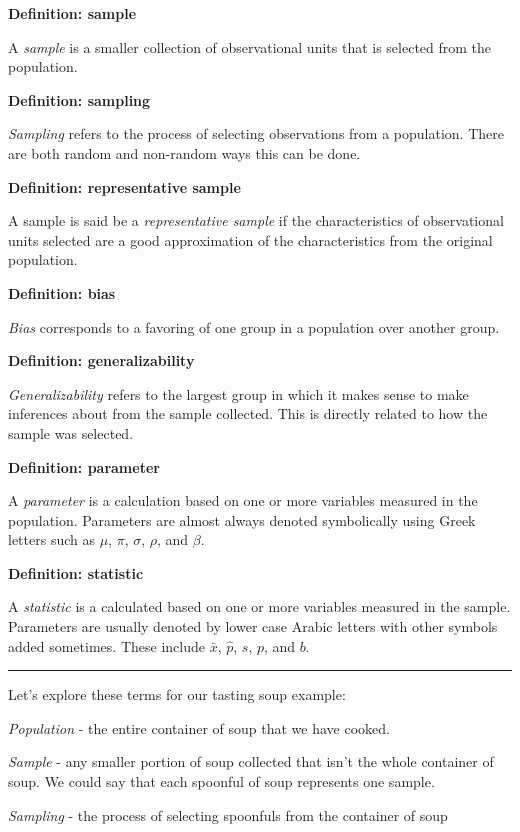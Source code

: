 \documentclass[]{tufte-book}
\let\oldrule=\rule
\renewcommand{\rule}[1]{\oldrule{\linewidth}}
\begin{document}
\textbf{Definition: sample}

A \emph{sample} is a smaller collection of observational units that is
selected from the population.

\textbf{Definition: sampling}

\emph{Sampling} refers to the process of selecting observations from a
population. There are both random and non-random ways this can be done.

\textbf{Definition: representative sample}

A sample is said be a \emph{representative sample} if the
characteristics of observational units selected are a good approximation
of the characteristics from the original population.

\textbf{Definition: bias}

\emph{Bias} corresponds to a favoring of one group in a population over
another group.

\textbf{Definition: generalizability}

\emph{Generalizability} refers to the largest group in which it makes
sense to make inferences about from the sample collected. This is
directly related to how the sample was selected.

\textbf{Definition: parameter}

A \emph{parameter} is a calculation based on one or more variables
measured in the population. Parameters are almost always denoted
symbolically using Greek letters such as \(\mu\), \(\pi\), \(\sigma\),
\(\rho\), and \(\beta\).

\textbf{Definition: statistic}

A \emph{statistic} is a calculated based on one or more variables
measured in the sample. Parameters are usually denoted by lower case
Arabic letters with other symbols added sometimes. These include
\(\bar{x}\), \(\hat{p}\), \(s\), \(p\), and \(b\).

\begin{center}\rule{0.5\linewidth}{\linethickness}\end{center}

Let's explore these terms for our tasting soup example:

\emph{Population} - the entire container of soup that we have cooked.

\emph{Sample} - any smaller portion of soup collected that isn't the
whole container of soup. We could say that each spoonful of soup
represents one sample.

\emph{Sampling} - the process of selecting spoonfuls from the container
of soup
\end{document}
